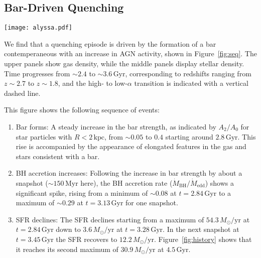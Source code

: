 \documentclass[twocolumn,linenumbers]{aastex631}
\newcommand{\Msun}{\ensuremath{M_{\odot}}}
\newcommand{\Gyr}{\ensuremath{\textrm{Gyr}}}
\newcommand{\Myr}{\ensuremath{\textrm{Myr}}}
\newcommand{\kpc}{\ensuremath{\textrm{kpc}}}
\newcommand{\Msunyr}{\ensuremath{\Msun/\textrm{yr}}}
\begin{document}
\subsection{Bar-Driven Quenching}\label{ssec:sequence_of_events}
\begin{figure*}
  \centering
  \texttt{[image: alyssa.pdf]}
  \caption{\textbf{Quiescence separating the high- and low-$\alpha$ sequences is preceded by AGN activity associated with bar formation.} Surface density projections of gas (top row) and star particles (middle row) in our galaxy across snapshots at different times during the high- to low-$\alpha$ transition. Below the projections is a plot showing the SFR, BH accretion rate (in units of $\dot{M}_{\textrm{BH}}/\dot{M}_{\textrm{edd}}$), and bar strength ($A_2/A_0$ for $R<2$ kpc). Time ranges from $\sim2.4\,\textrm{Gyr}$ to $\sim3.6\,\textrm{Gyr}$, corresponding to redshifts from $z\sim2.7$ to $z\sim1.8$. A sequence of events in which the bar strengthens, BH accretion increases, and SFR declines is seen, and is described more fully in the text.}
  \label{fig:seq}
\end{figure*}

We find that a quenching episode is driven by the formation of a bar contemperaneous with an increase in AGN activity, shown in Figure~\ref{fig:seq}. The upper panels show gas density, while the middle panels display stellar density. Time progresses from $\sim2.4$ to $\sim3.6\,\textrm{Gyr}$, corresponding to redshifts ranging from $z\sim2.7$ to $z\sim1.8$, and the high- to low-$\alpha$ transition is indicated with a vertical dashed line.

This figure shows the following sequence of events:
\begin{enumerate}
    \item Bar forms: A steady increase in the bar strength, as indicated by $A_2/A_0$ for star particles with $R<2\,\kpc$, from $\sim0.05$ to $0.4$ starting around $2.8\,\textrm{Gyr}$. This rise is accompanied by the appearance of elongated features in the gas and stars consistent with a bar.
    \item BH accretion increases: Following the increase in bar strength by about a snapshot ($\sim150\,\Myr$ here), the BH accretion rate ($\dot{M}_{\textrm{BH}}/\dot{M}_{\textrm{edd}}$) shows a significant spike, rising from a minimum of $\sim0.08$ at $t=2.84\,\Gyr$ to a maximum of $\sim0.29$ at $t=3.13\,\Gyr$ for one snapshot.
    \item SFR declines: The SFR declines starting from a maximum of $54.3\,\Msunyr$ at $t=2.84\,\Gyr$ down to $3.6\,\Msunyr$ at $t=3.28\,\Gyr$. In the next snapshot at $t=3.45\,\Gyr$ the SFR recovers to $12.2\,\Msunyr$. Figure~\ref{fig:history} shows that it reaches its second maximum of $30.9\,\Msunyr$ at $4.5\,\Gyr$.
\end{enumerate}
\end{document}
